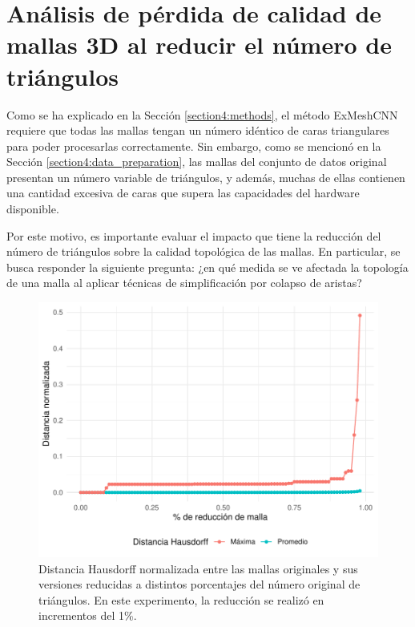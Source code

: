 \section{Análisis de pérdida de calidad de mallas 3D al reducir el número de triángulos}
\label{section5:experiment_edge_collapse}
Como se ha explicado en la Sección \ref{section4:methods}, el método ExMeshCNN requiere que todas las mallas tengan un número idéntico de caras triangulares para poder procesarlas correctamente. Sin embargo, como se mencionó en la Sección \ref{section4:data_preparation}, las mallas del conjunto de datos original presentan un número variable de triángulos, y además, muchas de ellas contienen una cantidad excesiva de caras que supera las capacidades del hardware disponible.

Por este motivo, es importante evaluar el impacto que tiene la reducción del número de triángulos sobre la calidad topológica de las mallas. En particular, se busca responder la siguiente pregunta: ¿en qué medida se ve afectada la topología de una malla al aplicar técnicas de simplificación por colapso de aristas?

\begin{figure}[h]
    \centering
    \includegraphics[width=\linewidth]{figures/4_experiments/mesh_redux_study.pdf}
    \caption[Estudio de reducción de mallas]{Distancia Hausdorff normalizada entre las mallas originales y sus versiones reducidas a distintos porcentajes del número original de triángulos. En este experimento, la reducción se realizó en incrementos del 1\%.}
    \label{fig5:redux_study}
\end{figure}

